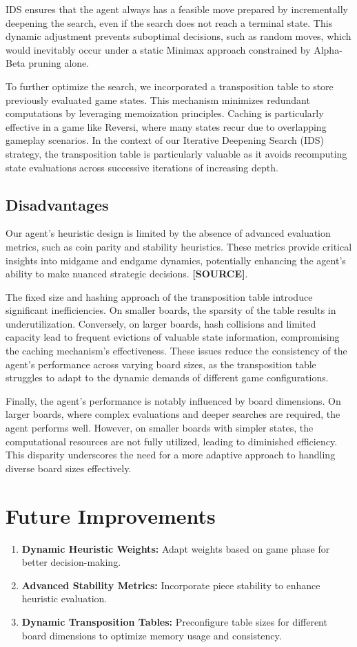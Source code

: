 \documentclass[11pt]{article}
\begin{document}
IDS ensures that the agent always has a feasible move prepared by incrementally deepening the search, even if the search does not reach a terminal state. This dynamic adjustment prevents suboptimal decisions, such as random moves, which would inevitably occur under a static Minimax approach constrained by Alpha-Beta pruning alone.

To further optimize the search, we incorporated a transposition table to store previously evaluated game states. This mechanism minimizes redundant computations by leveraging memoization principles. Caching is particularly effective in a game like Reversi, where many states recur due to overlapping gameplay scenarios. In the context of our Iterative Deepening Search (IDS) strategy, the transposition table is particularly valuable as it avoids recomputing state evaluations across successive iterations of increasing depth.

\subsection*{Disadvantages}
Our agent's heuristic design is limited by the absence of advanced evaluation metrics, such as coin parity and stability heuristics. These metrics provide critical insights into midgame and endgame dynamics, potentially enhancing the agent's ability to make nuanced strategic decisions. \textbf{[SOURCE]}.

The fixed size and hashing approach of the transposition table introduce significant inefficiencies. On smaller boards, the sparsity of the table results in underutilization. Conversely, on larger boards, hash collisions and limited capacity lead to frequent evictions of valuable state information, compromising the caching mechanism's effectiveness. These issues reduce the consistency of the agent's performance across varying board sizes, as the transposition table struggles to adapt to the dynamic demands of different game configurations.

Finally, the agent's performance is notably influenced by board dimensions. On larger boards, where complex evaluations and deeper searches are required, the agent performs well. However, on smaller boards with simpler states, the computational resources are not fully utilized, leading to diminished efficiency. This disparity underscores the need for a more adaptive approach to handling diverse board sizes effectively.


\section*{Future Improvements}
\begin{enumerate}
    \item \textbf{Dynamic Heuristic Weights:} Adapt weights based on game phase for better decision-making.
    \item \textbf{Advanced Stability Metrics:} Incorporate piece stability to enhance heuristic evaluation.
    \item \textbf{Dynamic Transposition Tables:} Preconfigure table sizes for different board dimensions to optimize memory usage and consistency.
\end{enumerate}
\end{document}
